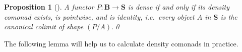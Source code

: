 \documentclass[11pt, oneside, article]{memoir}
\theoremstyle{plain}
\newtheorem{proposition}[theorem]{Proposition}
\theoremstyle{definition}
\theoremstyle{remark}
\DeclareMathOperator{\im}{im}
\DeclareMathOperator{\Psh}{Psh}
\DeclarePairedDelimiter{\gen}{\langle}{\rangle}
\newcommand{\dash}{{\mathord{\text{--}}}}
\newcommand{\cat}[1]{\mathbf{#1}}
\newcommand{\nerve}[1]{(\dash)^{#1}}
\newcommand{\ph}[1]{#1}
\newcommand{\Ps}[1]{\Psh(#1)}
\newcommand{\Ho}[1]{#1}
\newcommand{\xA}{A}
\newcommand{\xU}{U}
\newcommand{\bB}{\cat{B}}
\newcommand{\bS}{\cat{S}}
\newcommand{\pP}{\ph{P}}
\newcommand{\cP}{\gen{\pP}}
\newcommand{\anoteNI}[1]{}
\begin{document}
\begin{proposition}[{\cite[Proposition X.6.2]{maclane}}]\label{prop:densecolimit}
  A functor $\pP \colon \bB \to \bS$ is dense if and only if its
  density comonad exists, is pointwise, and is identity, i.e.\ every
  object $\xA$ in $\bS$ is the canonical colimit of shape $(\pP / \xA)$.\qed
\end{proposition}
%

The following lemma will help us to calculate density comonads in practice.
\end{document}
